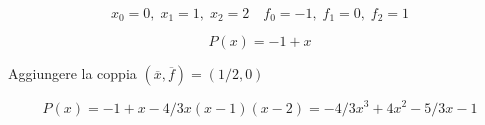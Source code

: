 \[ x_0=0, \; x_1=1, \; x_2=2 \quad f_0=-1, \; f_1=0, \; f_2=1 \]

\[ P(x)=-1+x \]

\medskip

\noindent Aggiungere la coppia $(\overline{x},\overline{f})=(1/2,0)$

\[ P(x)=-1+x-4/3x(x-1)(x-2)=-4/3x^3+4x^2-5/3x-1 \]

